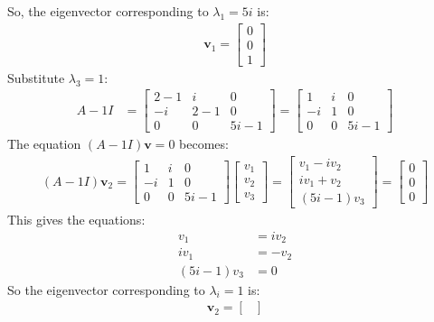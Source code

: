 \begin{enumerate}
So, the eigenvector corresponding to $\lambda_1 = 5i$ is:
\begin{align}
    \mathbf{v}_1 = \begin{bmatrix}
    0 \\
    0 \\
    1
\end{bmatrix}
\end{align}
Substitute $\lambda_3 = 1$:
\begin{align*}
    A - 1I &= \begin{bmatrix}
    2-1 & i & 0 \\
    -i & 2-1 & 0 \\
    0 & 0 & 5i - 1
    \end{bmatrix} = \begin{bmatrix}
    1 & i & 0 \\
    -i & 1 & 0 \\
    0 & 0 & 5i-1
    \end{bmatrix}
\end{align*}
The equation $\displaystyle (A - 1I)\mathbf{v}=0$ becomes:
\begin{align*}
    (A - 1I)\mathbf{v}_2 = \begin{bmatrix}
    1 & i & 0 \\
    -i & 1 & 0 \\
    0 & 0 & 5i - 1
    \end{bmatrix} \begin{bmatrix}
    v_1 \\
    v_2 \\
    v_3
    \end{bmatrix} = \begin{bmatrix}
    v_1-iv_2 \\
    iv_1+v_2 \\
    (5i - 1)v_3
    \end{bmatrix} = \begin{bmatrix}
    0 \\
    0 \\
    0
    \end{bmatrix}
\end{align*}
This gives the equations:
\begin{align*}
    v_1 &= iv_2 \\
    iv_1 &= -v_2 \\
    (5i - 1)v_3 &= 0
\end{align*}
So the eigenvector corresponding to $\lambda_i=1$ is:
\begin{align}
    \mathbf{v}_2 = \begin{bmatrix}

\end{bmatrix}
\end{align}
\end{enumerate}
